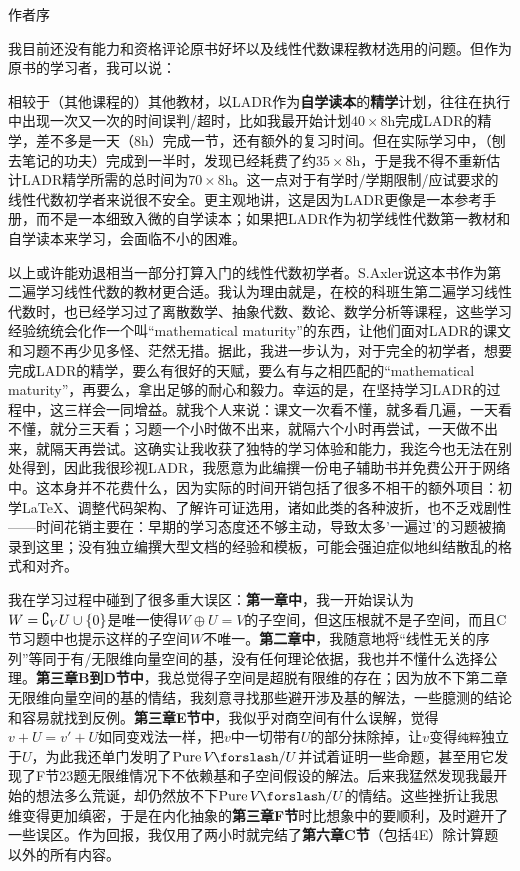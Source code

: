 \centerline{\Large 作者序}\vspace{6pt}\par
{\small 我目前还没有能力和资格评论原书好坏以及线性代数课程教材选用的问题。但作为原书的学习者，我可以说：\par\vspace{2pt}
相较于（其他课程的）其他教材，以LADR作为\textbf{自学读本}的\textbf{精学}计划，往往在执行中出现一次又一次的时间误判/超时，比如我最开始计划$40\times 8$h完成LADR的精学，差不多是一天（$8$h）完成一节，还有额外的复习时间。但在实际学习中，（刨去笔记的功夫）完成到一半时，发现已经耗费了约$35\times 8$h，于是我不得不重新估计LADR精学所需的总时间为$70\times 8$h。这一点对于有学时/学期限制/应试要求的线性代数初学者来说很不安全。更主观地讲，这是因为LADR更像是一本参考手册，而不是一本细致入微的自学读本；如果把LADR作为初学线性代数第一教材和自学读本来学习，会面临不小的困难。\par\vspace{4pt}
以上或许能劝退相当一部分打算入门的线性代数初学者。S.Axler说这本书作为第二遍学习线性代数的教材更合适。我认为理由就是，在校的科班生第二遍学习线性代数时，也已经学习过了离散数学、抽象代数、数论、数学分析等课程，这些学习经验统统会化作一个叫“mathematical maturity”的东西，让他们面对LADR的课文和习题不再少见多怪、茫然无措。据此，我进一步认为，对于完全的初学者，想要完成LADR的精学，要么有很好的天赋，要么有与之相匹配的“mathematical maturity”，再要么，拿出足够的耐心和毅力。幸运的是，在坚持学习LADR的过程中，这三样会一同增益。就我个人来说：课文一次看不懂，就多看几遍，一天看不懂，就分三天看；习题一个小时做不出来，就隔六个小时再尝试，一天做不出来，就隔天再尝试。这确实让我收获了独特的学习体验和能力，我迄今也无法在别处得到，因此我很珍视LADR，我愿意为此编撰一份电子辅助书并免费公开于网络中。这本身并不花费什么，因为实际的时间开销包括了很多不相干的额外项目：初学\LaTeX、调整代码架构、了解许可证选用，诸如此类的各种波折，也不乏戏剧性——时间花销主要在：早期的学习态度还不够主动，导致太多'一遍过'的习题被摘录到这里；没有独立编撰大型文档的经验和模板，可能会强迫症似地纠结散乱的格式和对齐。\par\vspace{4pt}
{\footnotesize 我在学习过程中碰到了很多重大误区：\textbf{第一章中}，我一开始误认为$W=\complement_V U\cup\text{\normalsize\{}0\text{\normalsize\}}$是唯一使得$W\oplus U=V$的子空间，但这压根就不是子空间，而且C节习题中也提示这样的子空间$W$不唯一。\textbf{第二章中}，我随意地将“线性无关的序列”等同于有/无限维向量空间的基，没有任何理论依据，我也并不懂什么选择公理。\textbf{第三章B到D节中}，我总觉得子空间是超脱有限维的存在；因为放不下第二章无限维向量空间的基的情结，我刻意寻找那些避开涉及基的解法，一些臆测的结论和容易就找到反例。\textbf{第三章E节中}，我似乎对商空间有什么误解，觉得$v+U=v'+U$如同变戏法一样，把$v$中一切带有$U$的部分抹除掉，让$v$变得\texttt{纯粹}独立于$U$，为此我还单门发明了$\text{Pure}\,V\XSlash U$并试着证明一些命题，甚至用它发现了F节23题无限维情况下不依赖基和子空间假设的解法。后来我猛然发现我最开始的想法多么荒诞，却仍然放不下$\text{Pure}\,V\XSlash U$的情结。这些挫折让我思维变得更加缜密，于是在内化抽象的\textbf{第三章F节}时比想象中的要顺利，及时避开了一些误区。作为回报，我仅用了两小时就完结了\textbf{第六章C节}\!（包括4E）\!除计算题以外的所有内容。
}\par\vspace{4pt}
}
\pagebreak

